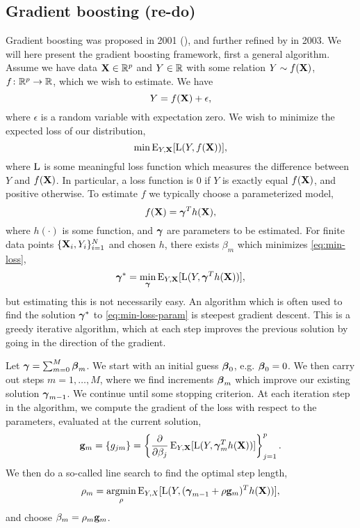 \subsection*{Gradient boosting (re-do)}
Gradient boosting was proposed in 2001 (\cite{friedman2001}), and further refined by \cite{buhlmann-yu} in 2003. We will here present the gradient boosting framework, first a general algorithm.
Assume we have data $\mathbf{X}\in\mathbb{R}^p$ and $Y\in\mathbb{R}$ with some relation $Y\sim f(\mathbf{X})$, $f\colon\mathbb{R}^p\to\mathbb{R}$, which we wish to estimate. We have
\begin{equation*}
    Y=f(\mathbf{X})+\epsilon,
\end{equation*}
where $\epsilon$ is a random variable with expectation zero. We wish to minimize the expected loss of our distribution,
\begin{equation}\label{eq:min-loss}
    \min\operatorname{E}_{Y,\mathbf{X}}[\operatorname{L}(Y,f(\mathbf{X}))],
\end{equation}
where $\operatorname{L}$ is some meaningful loss function which measures the difference between $Y$ and $f(\mathbf{X})$. In particular, a loss function is 0 if $Y$ is exactly equal $f(\mathbf{X})$, and positive otherwise. To estimate $f$ we typically choose a parameterized model,
\begin{equation}
    f(\mathbf{X})=\boldsymbol{\gamma}^Th(\mathbf{X}),
\end{equation}
where $h(\cdot)$ is some function, and $\boldsymbol{\gamma}$ are parameters to be estimated. For finite data points $\{\mathbf{X}_i,Y_i\}_{i=1}^N$ and chosen $h$, there exists $\beta_m$ which minimizes \eqref{eq:min-loss},
\begin{equation}\label{eq:min-loss-param}
    \boldsymbol{\gamma}^*=\underset{\boldsymbol{\gamma}}{\min}\operatorname{E}_{Y,\mathbf{X}}[\operatorname{L}(Y,\boldsymbol{\gamma}^Th(\mathbf{X}))],
\end{equation}
but estimating this is not necessarily easy. An algorithm which is often used to find the solution $\boldsymbol{\gamma}^*$ to \ref{eq:min-loss-param} is steepest gradient descent. This is a greedy iterative algorithm, which at each step improves the previous solution by going in the direction of the gradient.

Let $\boldsymbol{\gamma}=\sum_{m=0}^M\boldsymbol{\beta}_m$. We start with an initial guess $\boldsymbol{\beta}_0$, e.g. $\boldsymbol{\beta}_0=0$. We then carry out steps $m=1,\dotsc,M$, where we find increments $\boldsymbol{\beta}_m$ which improve our existing solution $\boldsymbol{\gamma}_{m-1}$. We continue until some stopping criterion. At each iteration step in the algorithm, we compute the gradient of the loss with respect to the parameters, evaluated at the current solution,
\begin{equation}
    \mathbf{g}_m=\{g_{jm}\}=\left\{\frac{\partial}{\partial\beta_j}\operatorname{E}_{Y,\mathbf{X}}[\operatorname{L}(Y,\boldsymbol{\gamma}_{m}^Th(\mathbf{X}))]\right\}_{j=1}^{p}.
\end{equation}
We then do a so-called line search to find the optimal step length,
\begin{equation}
    \rho_m=\underset{\rho}{\operatorname{argmin}}\operatorname{E}_{Y,X}[\operatorname{L}(Y,(\boldsymbol{\gamma}_{m-1}+\rho \mathbf{g}_m)^Th(\mathbf{X}))],
\end{equation}
and choose $\beta_m=\rho_m\mathbf{g}_m$.

